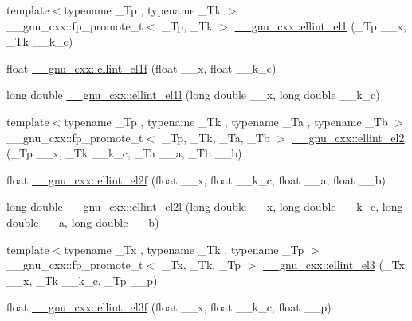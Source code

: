 \begin{DoxyCompactItemize}
\item 
{\footnotesize template$<$typename \+\_\+\+Tp , typename \+\_\+\+Tk $>$ }\\\+\_\+\+\_\+gnu\+\_\+cxx\+::fp\+\_\+promote\+\_\+t$<$ \+\_\+\+Tp, \+\_\+\+Tk $>$ \hyperlink{group__gnu__math__spec__func_ga510b1e51e7d3bc937ed1b4c2f57492e4}{\+\_\+\+\_\+gnu\+\_\+cxx\+::ellint\+\_\+el1} (\+\_\+\+Tp \+\_\+\+\_\+x, \+\_\+\+Tk \+\_\+\+\_\+k\+\_\+c)
\item 
float \hyperlink{group__gnu__math__spec__func_ga8d8342bb4f42c7fe09b5589c54d4e713}{\+\_\+\+\_\+gnu\+\_\+cxx\+::ellint\+\_\+el1f} (float \+\_\+\+\_\+x, float \+\_\+\+\_\+k\+\_\+c)
\item 
long double \hyperlink{group__gnu__math__spec__func_gaeed1201e421be410460739048cba5cd8}{\+\_\+\+\_\+gnu\+\_\+cxx\+::ellint\+\_\+el1l} (long double \+\_\+\+\_\+x, long double \+\_\+\+\_\+k\+\_\+c)
\item 
{\footnotesize template$<$typename \+\_\+\+Tp , typename \+\_\+\+Tk , typename \+\_\+\+Ta , typename \+\_\+\+Tb $>$ }\\\+\_\+\+\_\+gnu\+\_\+cxx\+::fp\+\_\+promote\+\_\+t$<$ \+\_\+\+Tp, \+\_\+\+Tk, \+\_\+\+Ta, \+\_\+\+Tb $>$ \hyperlink{group__gnu__math__spec__func_ga6230131ce5679e0936a16a6b029d6342}{\+\_\+\+\_\+gnu\+\_\+cxx\+::ellint\+\_\+el2} (\+\_\+\+Tp \+\_\+\+\_\+x, \+\_\+\+Tk \+\_\+\+\_\+k\+\_\+c, \+\_\+\+Ta \+\_\+\+\_\+a, \+\_\+\+Tb \+\_\+\+\_\+b)
\item 
float \hyperlink{group__gnu__math__spec__func_ga0bf7469fe7ac92e9a2ffa0f92ea62248}{\+\_\+\+\_\+gnu\+\_\+cxx\+::ellint\+\_\+el2f} (float \+\_\+\+\_\+x, float \+\_\+\+\_\+k\+\_\+c, float \+\_\+\+\_\+a, float \+\_\+\+\_\+b)
\item 
long double \hyperlink{group__gnu__math__spec__func_ga491439a09e6000659444f52dc3c9f215}{\+\_\+\+\_\+gnu\+\_\+cxx\+::ellint\+\_\+el2l} (long double \+\_\+\+\_\+x, long double \+\_\+\+\_\+k\+\_\+c, long double \+\_\+\+\_\+a, long double \+\_\+\+\_\+b)
\item 
{\footnotesize template$<$typename \+\_\+\+Tx , typename \+\_\+\+Tk , typename \+\_\+\+Tp $>$ }\\\+\_\+\+\_\+gnu\+\_\+cxx\+::fp\+\_\+promote\+\_\+t$<$ \+\_\+\+Tx, \+\_\+\+Tk, \+\_\+\+Tp $>$ \hyperlink{group__gnu__math__spec__func_gaac07922e08fdf46cd509ff0cfa9ea1f0}{\+\_\+\+\_\+gnu\+\_\+cxx\+::ellint\+\_\+el3} (\+\_\+\+Tx \+\_\+\+\_\+x, \+\_\+\+Tk \+\_\+\+\_\+k\+\_\+c, \+\_\+\+Tp \+\_\+\+\_\+p)
\item 
float \hyperlink{group__gnu__math__spec__func_ga66131a8ecc14b5228a73a01121f60a35}{\+\_\+\+\_\+gnu\+\_\+cxx\+::ellint\+\_\+el3f} (float \+\_\+\+\_\+x, float \+\_\+\+\_\+k\+\_\+c, float \+\_\+\+\_\+p)

\end{DoxyCompactItemize}
